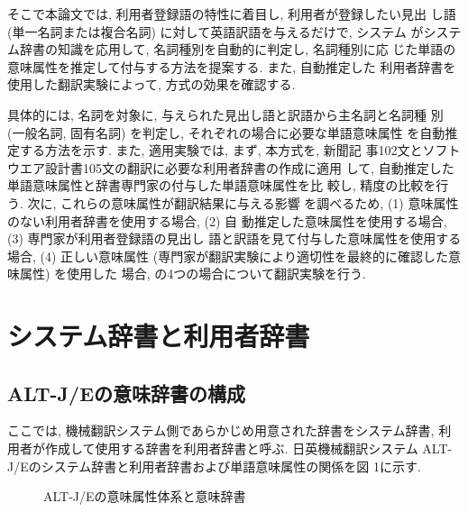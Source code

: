 そこで本論文では, 利用者登録語の特性に着目し, 利用者が登録したい見出
し語 (単一名詞または複合名詞) に対して英語訳語を与えるだけで, システム
がシステム辞書の知識を応用して, 名詞種別を自動的に判定し, 名詞種別に応
じた単語の意味属性を推定して付与する方法を提案する. また, 自動推定した
利用者辞書を使用した翻訳実験によって, 方式の効果を確認する. 

具体的には, 名詞を対象に, 与えられた見出し語と訳語から主名詞と名詞種
別 (一般名詞, 固有名詞) を判定し, それぞれの場合に必要な単語意味属性
を自動推定する方法を示す. また, 適用実験では, まず, 本方式を, 新聞記
事102文とソフトウエア設計書105文の翻訳に必要な利用者辞書の作成に適用
して, 自動推定した単語意味属性と辞書専門家の付与した単語意味属性を比
較し, 精度の比較を行う. 次に, これらの意味属性が翻訳結果に与える影響
を調べるため,  (1) 意味属性のない利用者辞書を使用する場合,  (2) 自
動推定した意味属性を使用する場合,  (3) 専門家が利用者登録語の見出し
語と訳語を見て付与した意味属性を使用する場合,  (4) 正しい意味属性
 (専門家が翻訳実験により適切性を最終的に確認した意味属性) を使用した
場合, の4つの場合について翻訳実験を行う. 

\vspace{-0.2mm}
\section{システム辞書と利用者辞書}
\label{sec:dic}
\subsection{ALT-J/Eの意味辞書の構成}
\label{sec:2.1}
 ここでは, 機械翻訳システム側であらかじめ用意された辞書をシステム辞書, 
利用者が作成して使用する辞書を利用者辞書と呼ぶ. 日英機械翻訳システム
ALT-J/Eのシステム辞書と利用者辞書および単語意味属性の関係を図
1に示す.  
{\unitlength=1mm
\begin{figure}[htbp]
  \begin{center}
    
    
    
\vspace{-0.2mm}
  \end{center}
  \caption{ALT-J/Eの意味属性体系と意味辞書}
  \label{fig:1}
\end{figure}
}

